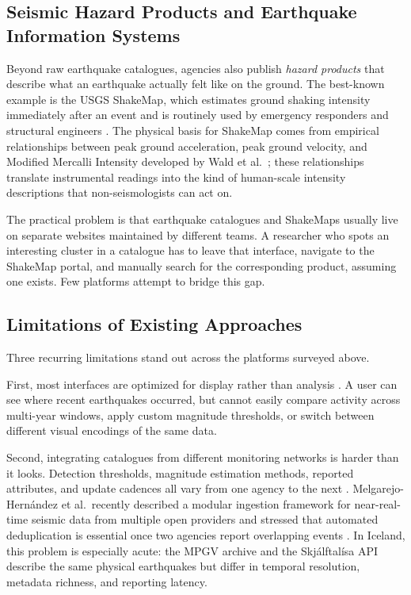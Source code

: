 \documentclass[12pt]{article}
\begin{document}
\subsection{Seismic Hazard Products and Earthquake Information Systems}

Beyond raw earthquake catalogues, agencies also publish \emph{hazard products} that describe what an earthquake actually felt like on the ground. The best-known example is the USGS ShakeMap, which estimates ground shaking intensity immediately after an event and is routinely used by emergency responders and structural engineers \cite{Wald2005ShakeMap}. The physical basis for ShakeMap comes from empirical relationships between peak ground acceleration, peak ground velocity, and Modified Mercalli Intensity developed by Wald et al.\ \cite{Wald1999ShakeMap}; these relationships translate instrumental readings into the kind of human-scale intensity descriptions that non-seismologists can act on.

The practical problem is that earthquake catalogues and ShakeMaps usually live on separate websites maintained by different teams. A researcher who spots an interesting cluster in a catalogue has to leave that interface, navigate to the ShakeMap portal, and manually search for the corresponding product, assuming one exists. Few platforms attempt to bridge this gap.

\subsection{Limitations of Existing Approaches}

Three recurring limitations stand out across the platforms surveyed above.

First, most interfaces are optimized for display rather than analysis \cite{Netek2018, Roth2013Interactive}. A user can see where recent earthquakes occurred, but cannot easily compare activity across multi-year windows, apply custom magnitude thresholds, or switch between different visual encodings of the same data.

Second, integrating catalogues from different monitoring networks is harder than it looks. Detection thresholds, magnitude estimation methods, reported attributes, and update cadences all vary from one agency to the next \cite{Wald2005ShakeMap}. Melgarejo-Hern{\'a}ndez et al.\ recently described a modular ingestion framework for near-real-time seismic data from multiple open providers and stressed that automated deduplication is essential once two agencies report overlapping events \cite{MelgarejoHernandez2026}. In Iceland, this problem is especially acute: the MPGV archive and the Skjálftalísa API describe the same physical earthquakes but differ in temporal resolution, metadata richness, and reporting latency.
\end{document}
